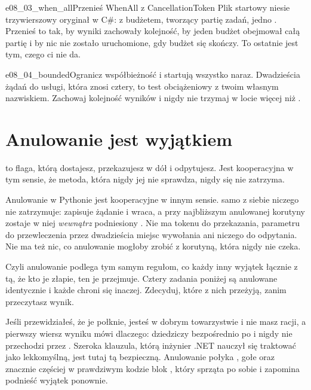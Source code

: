 \begin{exercise}{e08_03_when_all}{Przenieś WhenAll z CancellationToken}
Plik startowy niesie trzywierszowy oryginał w C\#:
 z budżetem,  tworzący partię
zadań, jedno . Przenieś to tak, by wyniki zachowały
kolejność, by jeden budżet obejmował całą partię i by nic nie zostało
uruchomione, gdy budżet się skończy. To ostatnie jest tym, czego
 ci nie da.
\end{exercise}

\begin{exercise}{e08_04_bounded}{Ogranicz współbieżność}
 i  startują wszystko naraz. Dwadzieścia żądań
do usługi, która znosi cztery, to test obciążeniowy z twoim własnym
nazwiskiem. Zachowaj kolejność wyników i nigdy nie trzymaj w locie więcej
niż .
\end{exercise}

\section{Anulowanie jest wyjątkiem}
\label{sec:asyncio-cancel}

 to flaga, którą dostajesz, przekazujesz w dół i
odpytujesz. Jest kooperacyjna w tym sensie, że metoda, która nigdy jej nie
sprawdza, nigdy się nie zatrzyma.

Anulowanie w Pythonie jest kooperacyjne w innym sensie.
 samo z siebie niczego nie zatrzymuje: zapisuje żądanie
i wraca, a przy najbliższym  anulowanej korutyny zostaje w niej
\emph{wewnątrz} podniesiony . Nie ma tokenu do
przekazania, parametru do przewleczenia przez dwadzieścia miejsc wywołania
ani niczego do odpytania. Nie ma też nic, co anulowanie mogłoby zrobić z
korutyną, która nigdy nie czeka.

Czyli anulowanie podlega tym samym regułom, co każdy inny wyjątek \dash{}
łącznie z tą, że kto je złapie, ten je przejmuje. Cztery zadania poniżej są
anulowane identycznie i każde chroni się inaczej. Zdecyduj, które z nich
przeżyją, zanim przeczytasz wynik.



\noindent
Jeśli przewidziałeś, że  je połknie, jesteś w dobrym
towarzystwie i nie masz racji, a pierwszy wiersz wyniku mówi dlaczego:
 dziedziczy bezpośrednio po  i
nigdy nie przechodzi przez . Szeroka klauzula, którą
inżynier .NET nauczył się traktować jako lekkomyślną, jest tutaj tą
bezpieczną. Anulowanie połyka , gołe
 oraz \dash{} znacznie częściej w prawdziwym kodzie \dash{}
blok , który sprząta po sobie i
zapomina podnieść wyjątek ponownie.

